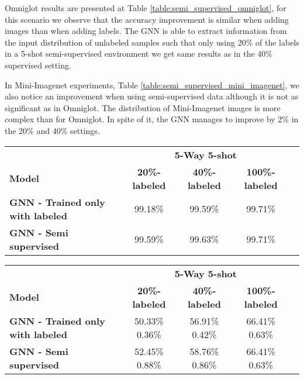 \documentclass{article} \usepackage{iclr2018_conference,times}
\begin{document}
Omniglot results are presented at Table \ref{table:semi_supervised_omniglot}, for this scenario we observe that the accuracy improvement is similar when adding images than when adding labels. The GNN is able to extract information from the input distribution of unlabeled samples such that only using 20\% of the labels in a 5-shot semi-supervised environment we get same results as in the 40\% supervised setting.


In Mini-Imagenet experiments, Table \ref{table:semi_supervised_mini_imagenet}, we also notice an improvement when using semi-supervised data although it is not as significant as in Omniglot. The distribution of Mini-Imagenet images is more complex than for Omniglot. In spite of it, the GNN manages to improve by  2\% in the 20\% and 40\% settings.


\begin{table*}[!htb]
\centering
\small
\begin{tabular}{l*{4}{c}} 

\hline & \multicolumn{3}{c}{\textbf{5-Way 5-shot}} &   \\
\textbf{Model} & \textbf{20\%-labeled} & \textbf{40\%-labeled}  &  \textbf{100\%-labeled} & \\ 
\hline

\textbf{GNN - Trained only with labeled}
    & 99.18\%    &   99.59\%    &  99.71\%    \\  
\textbf{GNN - Semi supervised}
    & 99.59\%    &   99.63\%    &  99.71\%   \\  

\hline

\end{tabular}
   \caption{Semi-Supervised Learning | Omniglot accuracies.}
\label{table:semi_supervised_omniglot}
\end{table*}


\begin{table*}[!htb]
\centering
\small
\begin{tabular}{l*{4}{c}} 

\hline & \multicolumn{3}{c}{\textbf{5-Way 5-shot}} &   \\
\textbf{Model} & \textbf{20\%-labeled} & \textbf{40\%-labeled}  &  \textbf{100\%-labeled} & \\ 
\hline

\textbf{GNN - Trained only with labeled}
    & 50.33\% 0.36\%    &   56.91\% 0.42\%    &  66.41\% 0.63\%    \\  
\textbf{GNN - Semi supervised}
    & 52.45\% 0.88\%    &   58.76\% 0.86\%    &  66.41\% 0.63\%   \\  

\hline

\end{tabular}
   \caption{Semi-Supervised Learning | Mini-Imagenet average accuracies with 95\% confidence intervals.}
\label{table:semi_supervised_mini_imagenet}
\end{table*}
\end{document}
